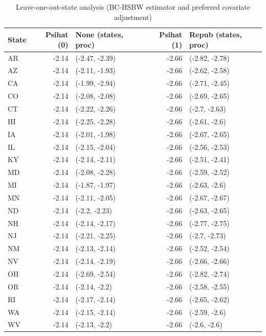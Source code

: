 \documentclass[12pt]{article}
\begin{document}
\begin{table}[ht]
\begin{tabular}{lrlrl}
  \toprule
State & Psihat (0) & None (states, proc) & Psihat (1) & Repub (states, proc) \\ 
  \midrule
AR & -2.14 & (-2.47, -2.39) & -2.66 & (-2.82, -2.78) \\ 
  AZ & -2.14 & (-2.11, -1.93) & -2.66 & (-2.62, -2.58) \\ 
  CA & -2.14 & (-1.99, -2.94) & -2.66 & (-2.71, -2.45) \\ 
  CO & -2.14 & (-2.08, -2.08) & -2.66 & (-2.69, -2.65) \\ 
  CT & -2.14 & (-2.22, -2.26) & -2.66 & (-2.7, -2.63) \\ 
  HI & -2.14 & (-2.25, -2.28) & -2.66 & (-2.61, -2.6) \\ 
  IA & -2.14 & (-2.01, -1.98) & -2.66 & (-2.67, -2.65) \\ 
  IL & -2.14 & (-2.15, -2.04) & -2.66 & (-2.56, -2.53) \\ 
  KY & -2.14 & (-2.14, -2.11) & -2.66 & (-2.51, -2.41) \\ 
  MD & -2.14 & (-2.08, -2.28) & -2.66 & (-2.59, -2.52) \\ 
  MI & -2.14 & (-1.87, -1.97) & -2.66 & (-2.63, -2.6) \\ 
  MN & -2.14 & (-2.11, -2.05) & -2.66 & (-2.67, -2.67) \\ 
  ND & -2.14 & (-2.2, -2.23) & -2.66 & (-2.63, -2.65) \\ 
  NH & -2.14 & (-2.14, -2.17) & -2.66 & (-2.77, -2.75) \\ 
  NJ & -2.14 & (-2.21, -2.25) & -2.66 & (-2.7, -2.73) \\ 
  NM & -2.14 & (-2.13, -2.14) & -2.66 & (-2.52, -2.54) \\ 
  NV & -2.14 & (-2.14, -2.19) & -2.66 & (-2.66, -2.66) \\ 
  OH & -2.14 & (-2.69, -2.54) & -2.66 & (-2.82, -2.74) \\ 
  OR & -2.14 & (-2.14, -2.2) & -2.66 & (-2.58, -2.55) \\ 
  RI & -2.14 & (-2.17, -2.14) & -2.66 & (-2.65, -2.62) \\ 
  WA & -2.14 & (-2.15, -2.14) & -2.66 & (-2.59, -2.6) \\ 
  WV & -2.14 & (-2.13, -2.2) & -2.66 & (-2.6, -2.6) \\ 
   \bottomrule
\end{tabular}
   \caption{Leave-one-out-state analysis (BC-HSBW estimator and preferred covariate adjustment)}
   \label{tab:sensitivityc1}
\end{table}
\end{document}
